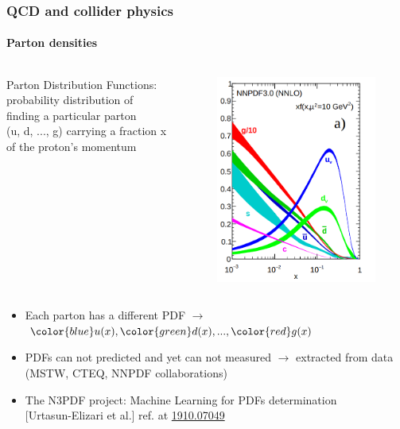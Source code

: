 \documentclass[aspectratio=43]{beamer}
\begin{document}
\begin{frame}
	
	\frametitle{QCD and collider physics}
	\framesubtitle{Parton densities}
	
	\footnotesize

	\begin{columns}
	

	{\color{blue} Parton Distribution Functions: probability distribution of finding a particular parton \\ (u, d, ..., g) carrying a fraction x of the proton's momentum}

	
	\begin{figure}
		\includegraphics[width = 3 cm]{plots/part1/chapter2/PDF.png}
	\end{figure}
	
	\end{columns}

	\begin{itemize}
		\item Each parton has a different PDF $\longrightarrow$ ${\color{blue}u(x)}, {\color{green}d(x)}, ..., {\color{red}g(x)}$
		\item PDFs can not predicted and yet can not measured $\longrightarrow$ extracted from data \\ (MSTW, CTEQ, NNPDF collaborations)
		\item The N3PDF project: Machine Learning for PDFs determination \\
		{\color{blue}[Urtasun-Elizari et al.]} ref. at {\color{blue} \href{https://arxiv.org/abs/1910.07049}{1910.07049}}
	\end{itemize}

\end{frame}
\end{document}
